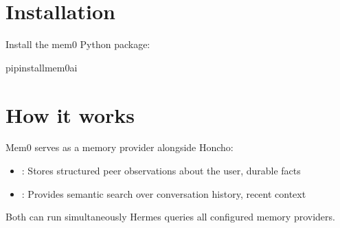 \documentclass[a4paper,10pt,english]{sphinxmanual}
\begin{document}
\section{Installation}
\label{\detokenize{mem0-memory-plugin:installation}}
\sphinxAtStartPar
Install the mem0 Python package:

\begin{sphinxVerbatim}[commandchars=\\\{\}]
pipinstallmem0ai
\end{sphinxVerbatim}


\section{How it works}
\label{\detokenize{mem0-memory-plugin:how-it-works}}
\sphinxAtStartPar
Mem0 serves as a  memory provider alongside Honcho:
\begin{itemize}
\item {} 
\sphinxAtStartPar
{}: Stores structured peer observations about the user, durable facts

\item {} 
\sphinxAtStartPar
{}: Provides semantic search over conversation history, recent context

\end{itemize}

\sphinxAtStartPar
Both can run simultaneously \sphinxhyphen{} Hermes queries all configured memory providers.



\renewcommand{\indexname}{Index}
\printindex
\end{document}

